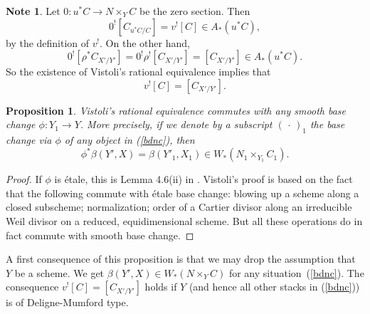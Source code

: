 \documentclass[11pt]{article}
\theoremstyle{plain}
\newtheorem{prop}{Proposition}[section]
\theoremstyle{definition}
\newtheorem{notep}{Note}\renewcommand{\thenotep}{}
\newenvironment{note}{\begin{notep}\normalfont}{\end{notep}}
\newenvironment{pf}{\begin{proof}}{\end{proof}}
\newcommand{\upst}{^{\ast}}
\newcommand{\upsh}{^{!}}
\newcommand{\lst}{_{\ast}}
\newcommand{\argument}{{{\,\cdot\,}}}
\theoremstyle{plain}
\theoremstyle{definition}
\theoremstyle{remark}
\begin{document}
\begin{note}
Let \(0:u\upst C\rightarrow N\times_YC\) be the zero section. Then
\[
0\upsh[C_{u\upst C/C}]=v\upsh[C]\in A\lst(u\upst C),
\]
by the
definition of \(v\upsh\). On the other hand,
\[
0\upsh[\rho\upst
C_{X'/Y'}]=0\upsh\rho\upsh[C_{X'/Y'}]=[C_{X'/Y'}]\in A\lst(u\upst
C).
\]
So the existence of Vistoli's rational equivalence implies that
\[
v\upsh[C]=[C_{X'/Y'}].
\]
\end{note}

\begin{prop}  \label{vrqsb}
Vistoli's rational equivalence commutes with any smooth base change
\(\phi:Y_1\rightarrow Y\). More precisely, if we denote by a subscript
\((\argument)_1\) the base change via \(\phi\) of any object in
(\ref{bdnc}), then
\[
\phi\upst\beta(Y',X)=\beta(Y'_1,X_1)\in W\lst(N_1\times_{Y_1}C_1).
\]
\end{prop}
\begin{pf}
If \(\phi\) is \'etale, this is Lemma 4.6(ii) in \cite{vistoli}. Vistoli's proof
is based on the fact that the following commute with \'etale base change:
blowing up a scheme along a closed subscheme; normalization; order of
a Cartier divisor along an irreducible Weil divisor on a reduced,
equidimensional
scheme. But all these operations do in fact commute with smooth base change.
\end{pf}

A first consequence of this proposition is that we may drop the
assumption that \(Y\) be a scheme. We get \(\beta(Y',X)\in
W\lst(N\times_YC)\) for any situation~(\ref{bdnc}). The consequence
\(v\upsh[C]=[C_{X'/Y'}]\) holds if \(Y\) (and hence all other stacks in
(\ref{bdnc})) is of Deligne-Mumford type.
\end{document}
